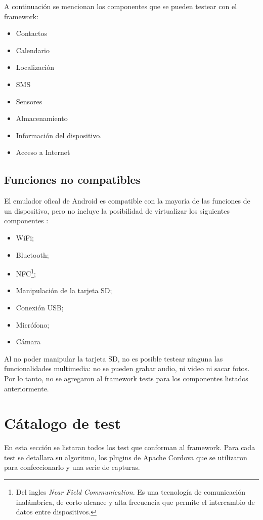 A continuación se mencionan los componentes que se pueden testear con el framework:
\begin{itemize}
	\item Contactos
	\item Calendario
	\item Localización
	\item SMS
	\item Sensores
	\item Almacenamiento
	\item Información del dispositivo.
	\item Acceso a Internet
\end{itemize}
\subsection{Funciones no compatibles}
El emulador ofical de Android es compatible con la mayoría de las funciones de un dispositivo, pero no incluye la posibilidad de virtualizar los siguientes componentes \cite{daemu}:
\begin{itemize}
    \item WiFi;
    \item Bluetooth;
    \item NFC\footnote{Del ingles \emph{Near Field Communication}. Es una tecnología de comunicación inalámbrica, de corto alcance y alta frecuencia que permite el intercambio de datos entre dispositivos.};
    \item Manipulación de la tarjeta SD;
    \item Conexión USB;
    \item Micrófono;
    \item Cámara
\end{itemize}
Al no poder manipular la tarjeta SD, no es posible testear ninguna las funcionalidades multimedia: no se pueden grabar audio, ni video ni sacar fotos.\\
Por lo tanto, no se agregaron al framework tests para los componentes listados anteriormente.
\section{C\'atalogo de test}
En esta sección se listaran todos los test que conforman al framework. Para cada test se detallara su algoritmo, los plugins de Apache Cordova que se utilizaron para confeccionarlo y una serie de capturas.
